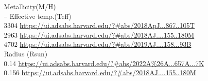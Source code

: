 Metallicity(M/H)\\
--
Effective temp.(Teff)\\
3304 \url{https://ui.adsabs.harvard.edu/?#abs/2018ApJ...867..105T}\\
2963 \url{https://ui.adsabs.harvard.edu/?#abs/2018AJ....155..180M}\\
4702 \url{https://ui.adsabs.harvard.edu/?#abs/2019AJ....158...93B}\\

Radius (Rsun)\\
0.14 \url{https://ui.adsabs.harvard.edu/?#abs/2022A%26A...657A...7K}\\
0.156 \url{https://ui.adsabs.harvard.edu/?#abs/2018AJ....155..180M}\\